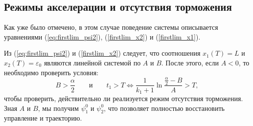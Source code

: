 \subsection{Режимы акселерации и отсутствия торможения}

Как уже было отмечено, в этом случае поведение системы описывается уравнениями (\ref{eq:firstlim_psi2}), (\ref{firstlim_x2}) и (\ref{firstlim_x1}).

Из (\ref{eq:firstlim_psi2}) и (\ref{firstlim_x2}) следует, что соотношения $x_1(T) = L$ и $x_2(T) = \varepsilon_0$ являются линейной системой по $A$ и $B$. После этого, если $A < 0$, то необходимо проверить условия:
$$
B > \frac{\alpha}{2} \qquad \mbox{и} \qquad t_1 > T \Leftrightarrow \frac{1}{k_1 + 1} \ln \frac{\frac{\alpha}{2} - B}{A} > T,
$$
чтобы проверить, действительно ли реализуется режим отсутствия торможения. Зная $A$ и $B$, мы получим $\psi_1^0$ и $\psi_2^0$, что позволяет полностью восстановить управление и траекторию.